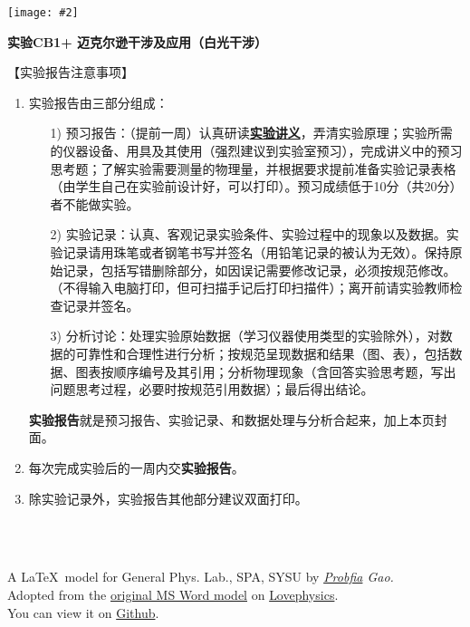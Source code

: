 \documentclass[11pt,a4paper]{ctexart}
\newcommand{\ExpeName}{实验CB1+ 迈克尔逊干涉及应用（白光干涉）}
\newcommand{\cpic}[2]{
\begin{center}
\texttt{[image: \#2]}
\end{center}
}
\begin{document}
\cpic{0.255}{e1}%
\begin{center}
\LARGE\textbf{{\ExpeName}}
\end{center}
\large{【实验报告注意事项】}
\begin{enumerate}
 \item 实验报告由三部分组成：
 \begin{enumerate}
  \item[1)]预习报告：（提前一周）认真研读\textbf{\uline{实验讲义}}，弄清实验原理；实验所需的仪器设备、用具及其使用（强烈建议到实验室预习），完成讲义中的预习思考题；了解实验需要测量的物理量，并根据要求提前准备实验记录表格（由学生自己在实验前设计好，可以打印）。预习成绩低于10分（共20分）者不能做实验。
  \item[2)]实验记录：认真、客观记录实验条件、实验过程中的现象以及数据。实验记录请用珠笔或者钢笔书写并签名（{\color{red}用铅笔记录的被认为无效}）。{\color{red}保持原始记录，包括写错删除部分，如因误记需要修改记录，必须按规范修改。}（不得输入电脑打印，但可扫描手记后打印扫描件）；离开前请实验教师检查记录并签名。
  \item[3)]分析讨论：处理实验原始数据（学习仪器使用类型的实验除外），对数据的可靠性和合理性进行分析；按规范呈现数据和结果（图、表），包括数据、图表按顺序编号及其引用；分析物理现象（含回答实验思考题，写出问题思考过程，必要时按规范引用数据）；最后得出结论。
 \end{enumerate}
 \textbf{实验报告}就是预习报告、实验记录、和数据处理与分析合起来，加上本页封面。
 \item 每次完成实验后的一周内交\textbf{实验报告}。
 \item 除实验记录外，实验报告其他部分建议双面打印。
\end{enumerate}
\ 
\\
\ 

\begin{flushright}                                                           %
\tiny{
A \LaTeX \ model for General Phys. Lab., SPA, SYSU by {\em \href{https://www.weibo.com/3532532974/profile?rightmod=1&wvr=6&mod=personinfo&is_all=1}{Probfia} Gao.}\\ Adopted from the \href{http://lovephysics.sysu.edu.cn/lib/exe/fetch.php?media=courses:secondlevelzhuhai:report.docx}{original MS Word model} on \href{http://lovephysics.sysu.edu.cn}{Lovephysics}.\\ You can view it on \href{https://github.com/Probfia/SYSU_GPL_C}{Github}.}
\end{flushright}
\end{document}
